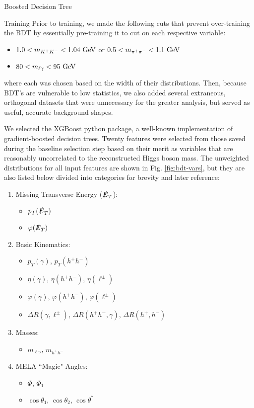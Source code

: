 \begin{section}{Boosted Decision Tree}
\begin{subsection}{Training}\label{training}
Prior to training, we made the following cuts that prevent over-training the BDT by essentially pre-training it to cut on each respective variable:

\begin{itemize}
    \item $1.0 < m_{K^{+}K^{-}} < 1.04\textnormal{ GeV}$ or $0.5 < m_{\pi^{+}\pi^{-}} < 1.1\textnormal{ GeV}$
    \item $80 < m_{\ell\gamma} < 95\textnormal{ GeV}$
\end{itemize}

\noindent where each was chosen based on the width of their distributions. Then, because BDT's are vulnerable to low statistics, we also added several extraneous, orthogonal datasets that were unnecessary for the greater analysis, but served as useful, accurate background shapes.

We selected the XGBoost python package, a well-known implementation of gradient-boosted decision trees. Twenty features were selected from those saved during the baseline selection step based on their merit as variables that are reasonably uncorrelated to the reconstructed Higgs boson mass. The unweighted distributions for all input features are shown in Fig. \ref{fig:bdt-vars}, but they are also listed below divided into categories for brevity and later reference:
\begin{enumerate}[(i.)]
    \item Missing Transverse Energy ($\slashed{E}_{T}$):
    \begin{itemize}
        \item $p_{T}(\slashed{E}_{T})$
        \item $\varphi(\slashed{E}_{T})$
    \end{itemize}
    \item Basic Kinematics:
    \begin{itemize}
        \item $p_{T}(\gamma)$, $p_{T}(h^{+}h^{-})$
        \item $\eta(\gamma)$, $\eta(h^{+}h^{-})$, $\eta(\ell^{\pm})$
        \item $\varphi(\gamma)$, $\varphi(h^{+}h^{-})$, $\varphi(\ell^{\pm})$
        \item $\Delta R(\gamma, \ell^{\pm})$, $\Delta R(h^{+}h^{-}, \gamma)$, $\Delta R(h^{+}, h^{-})$
    \end{itemize}
    \item Masses:
    \begin{itemize}
        \item $m_{\ell\gamma}$, $m_{h^{+}h^{-}}$
    \end{itemize}
    \item MELA ``Magic" Angles:
    \begin{itemize}
        \item $\Phi$, $\Phi_{1}$
        \item $\cos\theta_{1}$, $\cos\theta_{2}$, $\cos\theta^{*}$
    \end{itemize}
\end{enumerate}


\end{subsection}
\end{section}
